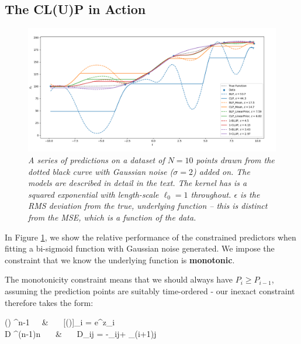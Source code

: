 \documentclass[]{article}
\begin{document}
				
	\subsection{The CL(U)P in Action}

		\begin{figure}[t]
			\includegraphics[width=\linewidth,keepaspectratio=true]{Figs/CLUP_comparison.png}
			\caption{\it A series of predictions on a dataset of $N=10$ points drawn from the dotted black curve with Gaussian noise ($\sigma=2$) added on. The models are described in detail in the text. The kernel has is a squared exponential with length-scale $\ell_0 = 1$ throughout. $\epsilon$ is the RMS deviation from the true, underlying function -- this is distinct from the MSE, which is a function of the data.}\label{F:CLUP}
		\end{figure}

		

		In Figure \ref{F:CLUP}, we show the relative performance of the constrained predictors when fitting a bi-sigmoid function with Gaussian noise generated. We impose the constraint that we know the underlying function is \textbf{monotonic}.
		
		The monotonicity constraint means that we should always have $P_{i} \geq P_{i-1}$, assuming the prediction points are suitably time-ordered - our inexact constraint therefore takes the form:
		\begin{spalign}
			() \in {}^{n-1}~~~&~~~ 	[()]_i = e^{z_i}
			\\
			D \in {}^{(n-1)\times n} ~~~&~~~ D_{ij}  = -\delta_{ij}+ \delta_{(i+1)j}\label{E:CLP_Monotone}
		\end{spalign}
\end{document}
